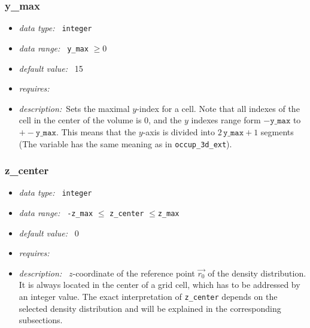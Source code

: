 \documentclass[a4paper,10pt]{article}
\begin{document}
\begin{appendix}
\subsubsection{y\_max}
\label{hydoptnl:ymax}
\begin{itemize}
 \item \textit{data type:~} \texttt{integer}
 \item \textit{data range:~} \texttt{y\_max} $\ge0$
 \item \textit{default value:~} 15
 \item \textit{requires:~}
 \item \textit{description:~}Sets the maximal $y$-index for a cell. Note that
  all indexes of the cell in the center of the volume is 0, and the  $y$ 
  indexes range form $-\mathtt{y\_max}$ to $+-\mathtt{y\_max}$. This means that 
  the $y$-axis is divided into $2\, \mathtt{y\_max} +1$ segments (The variable 
  has the same meaning as in \texttt{occup\_3d\_ext}).
\end{itemize}

\subsubsection{z\_center}
\label{hydoptnl:zcenter}
\begin{itemize}
 \item \textit{data type:~} \texttt{integer}
 \item \textit{data range:~} \texttt{-z\_max} $ \leq$ \texttt{z\_center} 
  $\leq $\texttt{z\_max} 
 \item \textit{default value:~} 0
 \item \textit{requires:~} 
 \item \textit{description:~} $z$-coordinate of the reference point $\vec{r_0}$
  of the density distribution.  It is always located in the center of a grid 
  cell, which has to be addressed by an integer value. 
  The exact interpretation of \texttt{z\_center} depends on the selected 
  density distribution and will be 
  explained in the corresponding subsections.
\end{itemize}



\end{appendix}
\end{document}
